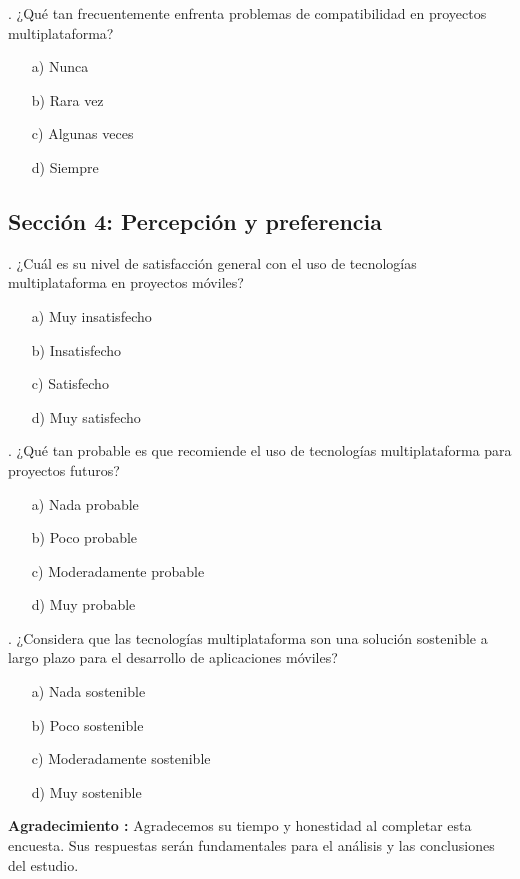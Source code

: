 . ¿Qué tan frecuentemente enfrenta problemas de compatibilidad en proyectos multiplataforma?  
   \begin{itemize}
       \item[a)] Nunca  
       \item[b)] Rara vez  
       \item[c)] Algunas veces  
       \item[d)] Siempre  
   \end{itemize}

\subsection*{Sección 4: Percepción y preferencia}

. ¿Cuál es su nivel de satisfacción general con el uso de tecnologías multiplataforma en proyectos móviles?  
    \begin{itemize}
        \item[a)] Muy insatisfecho  
        \item[b)] Insatisfecho  
        \item[c)] Satisfecho  
        \item[d)] Muy satisfecho  
    \end{itemize}

. ¿Qué tan probable es que recomiende el uso de tecnologías multiplataforma para proyectos futuros?  
    \begin{itemize}
        \item[a)] Nada probable  
        \item[b)] Poco probable  
        \item[c)] Moderadamente probable  
        \item[d)] Muy probable  
    \end{itemize}

. ¿Considera que las tecnologías multiplataforma son una solución sostenible a largo plazo para el desarrollo de aplicaciones móviles?  
    \begin{itemize}
        \item[a)] Nada sostenible  
        \item[b)] Poco sostenible  
        \item[c)] Moderadamente sostenible  
        \item[d)] Muy sostenible  
    \end{itemize}

\textbf{Agradecimiento : } Agradecemos su tiempo y honestidad al completar esta encuesta. Sus respuestas serán fundamentales para el análisis y las conclusiones del estudio.
